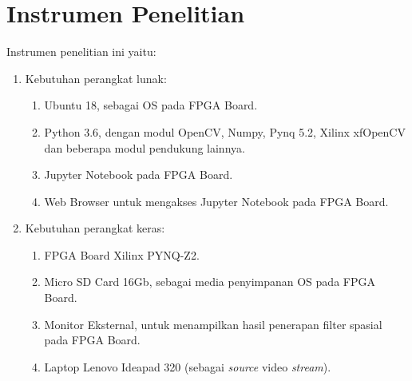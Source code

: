 \section{Instrumen Penelitian}
Instrumen penelitian ini yaitu:
\begin{enumerate}[topsep=0pt,itemsep=0pt,partopsep=0pt, parsep=0pt]
    \item Kebutuhan perangkat lunak:
    \begin{enumerate}[topsep=0pt,itemsep=0pt,partopsep=0pt, parsep=0pt, label={\alph*.}]
        \item Ubuntu 18, sebagai OS pada FPGA Board.
        \item Python 3.6, dengan modul OpenCV, Numpy, Pynq 5.2, Xilinx xfOpenCV dan beberapa modul pendukung lainnya.
        \item Jupyter Notebook pada FPGA Board. 
        \item Web Browser untuk mengakses Jupyter Notebook pada FPGA Board.
    \end{enumerate}
    \item Kebutuhan perangkat keras:
    \begin{enumerate}[topsep=0pt,itemsep=0pt,partopsep=0pt, parsep=0pt, label={\alph*.}]
        \item FPGA Board Xilinx PYNQ-Z2.
        \item Micro SD Card 16Gb, sebagai media penyimpanan OS pada FPGA Board.
        \item Monitor Eksternal, untuk menampilkan hasil penerapan filter spasial pada FPGA Board.
        \item Laptop Lenovo Ideapad 320 (sebagai \textit{source} video \textit{stream}).
    \end{enumerate}
\end{enumerate}
